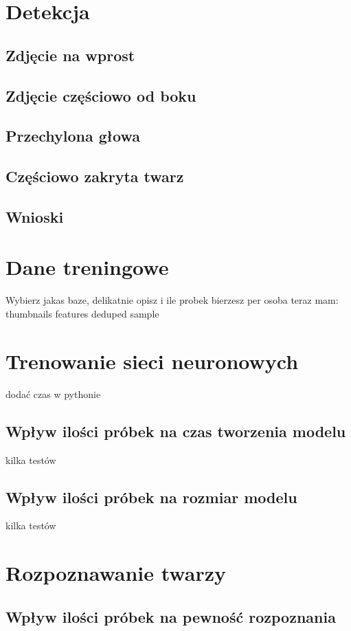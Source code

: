 \section{Detekcja}
\subsection{Zdjęcie na wprost}
\subsection{Zdjęcie częściowo od boku}
\subsection{Przechylona głowa}
\subsection{Częściowo zakryta twarz}
\subsection{Wnioski}

\section{Dane treningowe}
Wybierz jakas baze, delikatnie opisz i ile probek bierzesz per osoba
teraz mam: thumbnails features deduped sample

\section{Trenowanie sieci neuronowych}
dodać czas w pythonie
\subsection{Wpływ ilości próbek na czas tworzenia modelu}
kilka testów
\subsection{Wpływ ilości próbek na rozmiar modelu}
kilka testów

\section{Rozpoznawanie twarzy}
\subsection{Wpływ ilości próbek na pewność rozpoznania}

